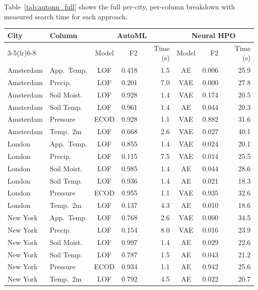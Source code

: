 \documentclass[12pt]{article}
\begin{document}
Table~\ref{tab:autonn_full} shows the full per-city, per-column breakdown with measured search time for each approach.

\begin{table}[!htbp]
\begin{center}
{\footnotesize
\setlength{\tabcolsep}{4pt}
\begin{tabular}{@{}l l c r r c r r@{}}
\toprule
City & Column
  & \multicolumn{3}{c}{AutoML}
  & \multicolumn{3}{c}{Neural HPO} \\
\cmidrule(lr){3-5}\cmidrule(lr){6-8}
  &  & Model & F2 & Time (s) & Model & F2 & Time (s) \\
\midrule
Amsterdam & App.\ Temp.  & LOF  & 0.418 &  1.5 & AE  & 0.006 & 25.9 \\
Amsterdam & Precip.      & LOF  & 0.201 &  7.0 & VAE & 0.000 & 27.8 \\
Amsterdam & Soil Moist.  & LOF  & 0.928 &  1.4 & VAE & 0.174 & 20.5 \\
Amsterdam & Soil Temp.   & LOF  & 0.961 &  1.4 & AE  & 0.044 & 20.3 \\
Amsterdam & Pressure     & ECOD & 0.928 &  1.1 & VAE & 0.882 & 31.6 \\
Amsterdam & Temp.\ 2m    & LOF  & 0.668 &  2.6 & VAE & 0.027 & 40.1 \\
\midrule
London    & App.\ Temp.  & LOF  & 0.855 &  1.4 & VAE & 0.024 & 20.1 \\
London    & Precip.      & LOF  & 0.115 &  7.5 & VAE & 0.014 & 25.5 \\
London    & Soil Moist.  & LOF  & 0.985 &  1.4 & AE  & 0.044 & 28.6 \\
London    & Soil Temp.   & LOF  & 0.936 &  1.4 & AE  & 0.021 & 18.3 \\
London    & Pressure     & ECOD & 0.955 &  1.1 & VAE & 0.935 & 32.6 \\
London    & Temp.\ 2m    & LOF  & 0.137 &  4.3 & AE  & 0.010 & 18.6 \\
\midrule
New York  & App.\ Temp.  & LOF  & 0.768 &  2.6 & VAE & 0.000 & 34.5 \\
New York  & Precip.      & LOF  & 0.154 &  8.0 & VAE & 0.016 & 23.9 \\
New York  & Soil Moist.  & LOF  & 0.997 &  1.4 & AE  & 0.029 & 22.6 \\
New York  & Soil Temp.   & LOF  & 0.787 &  1.5 & AE  & 0.043 & 21.2 \\
New York  & Pressure     & ECOD & 0.934 &  1.1 & AE  & 0.942 & 25.6 \\
New York  & Temp.\ 2m    & LOF  & 0.792 &  4.5 & AE  & 0.022 & 20.7 \\

\end{tabular}}
\end{center}
\end{table}
\end{document}
